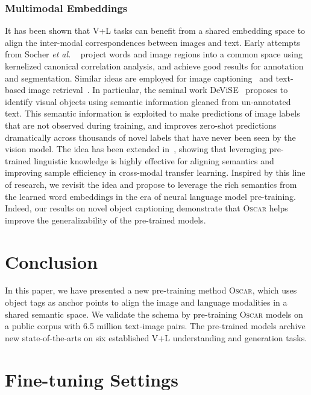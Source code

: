 \documentclass[runningheads]{llncs}
\newcommand{\ea}[0]{\emph{et al. }}
\newcommand{\short}{\textsc{Oscar}}
\begin{document}
\subsubsection{Multimodal Embeddings} It has been shown that V+L tasks can benefit from a shared embedding space to align the inter-modal correspondences between images and text. Early attempts from Socher \ea~\cite{socher2010connecting} project words and image regions into a common space using kernelized canonical correlation analysis, and achieve good results for annotation and segmentation. Similar ideas are employed for image captioning~\cite{karpathy2015deep} and text-based image retrieval~\cite{ren2016joint}. 
In particular, the seminal work DeViSE~\cite{frome2013devise} proposes to identify visual objects using semantic information gleaned from un-annotated text. This semantic information is exploited to make predictions of image labels that are not observed during training, and improves zero-shot predictions dramatically across thousands of novel labels that have never been seen by the vision model. The idea has been extended  in~\cite{socher2013zero,kiros2014unifying,norouzi2013zero}, showing that leveraging pre-trained linguistic knowledge is highly effective for aligning semantics and improving sample efficiency in cross-modal transfer learning. Inspired by this line of research, we revisit the idea and propose to leverage the rich semantics from the learned word embeddings in the era of neural language model pre-training. Indeed, our results on novel object captioning demonstrate that \short{} helps improve the generalizability of the pre-trained models. \section{Conclusion}
In this paper, we have presented a new pre-training method \short{}, which uses object tags as anchor points to align the image and language modalities in a shared semantic space. We validate the schema by pre-training \short{} models on a public corpus with 6.5 million text-image pairs. The pre-trained models archive new state-of-the-arts on six established V+L understanding and generation tasks.
%
 








\appendix
\newpage
\section{Fine-tuning Settings}
\end{document}
